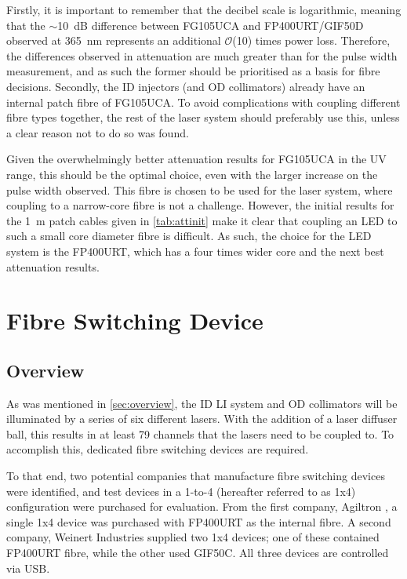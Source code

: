 \documentclass[a4paper,11pt]{article}
\let\oldsim\sim
\renewcommand{\sim}{{\oldsim}}
\begin{document}
Firstly, it is important to remember that the decibel scale is logarithmic, meaning that the $\sim$10~dB difference between FG105UCA and FP400URT/GIF50D observed at 365~nm represents an additional $\mathcal{O}$(10) times power loss. Therefore, the differences observed in attenuation are much greater than for the pulse width measurement, and as such the former should be prioritised as a basis for fibre decisions. Secondly, the ID injectors (and OD collimators) already have an internal patch fibre of FG105UCA. To avoid complications with coupling different fibre types together, the rest of the laser system should preferably use this, unless a clear reason not to do so was found.

Given the overwhelmingly better attenuation results for FG105UCA in the UV range, this should be the optimal choice, even with the larger increase on the pulse width observed. This fibre is chosen to be used for the laser system, where coupling to a narrow-core fibre is not a challenge. However, the initial results for the 1~m patch cables given in \cref{tab:attinit} make it clear that coupling an LED to such a small core diameter fibre is difficult. As such, the choice for the LED system is the FP400URT, which has a four times wider core and the next best attenuation results.



\section{Fibre Switching Device}\label{sec:switch}

\subsection{Overview}
As was mentioned in \cref{sec:overview}, the ID LI system and OD collimators will be illuminated by a series of six different lasers. With the addition of a laser diffuser ball, this results in at least 79 channels that the lasers need to be coupled to. To accomplish this, dedicated fibre switching devices are required.

To that end, two potential companies that manufacture fibre switching devices were identified, and test devices in a 1-to-4 (hereafter referred to as 1x4) configuration were purchased for evaluation. From the first company, Agiltron \cite{bib:agiltron}, a single 1x4 device was purchased with FP400URT as the internal fibre. A second company, Weinert Industries \cite{bib:weinert} supplied two 1x4 devices; one of these contained FP400URT fibre, while the other used GIF50C. All three devices are controlled via USB.
\end{document}
